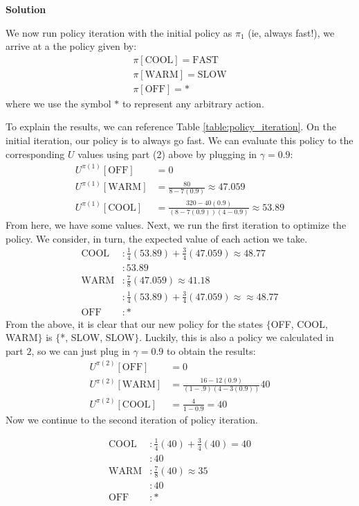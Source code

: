 \documentclass[11pt]{article}
\newcounter{AnswerCounter}
\newcounter{SubAnswerCounter}
\newenvironment{answer}[0]{
  \setcounter{SubAnswerCounter}{1}
  \bigskip
  \textbf{Solution \arabic{AnswerCounter}}
  \\
  \begin{small}
}{
  \end{small}
  \stepcounter{AnswerCounter}
}
\begin{document}
\begin{answer}
We now run policy iteration with the initial policy as $\pi_1$ (ie, always fast!), we arrive at a the policy given by:
\begin{align*}
\pi[\text{COOL}] = \text{FAST} \\
\pi[\text{WARM}] = \text{SLOW} \\
\pi[\text{OFF}] = *
\end{align*}
where we use the symbol $*$ to represent any arbitrary action.

To explain the results, we can reference Table \ref{table:policy_iteration}. On the initial iteration, our policy is to always go fast. We can evaluate this policy to the corresponding $U$ values using part (2) above by plugging in $\gamma = 0.9$:
\begin{align*}
U^{\pi(1)}[\text{OFF}] &= 0 \\
U^{\pi(1)}[\text{WARM}] &= \frac{80}{8-7(0.9)} \approx 47.059\\
U^{\pi(1)}[\text{COOL}] &= \frac{320 - 40(0.9)}{(8-7(0.9))(4 - 0.9)} \approx 53.89
\end{align*}
From here, we have some values. Next, we run the first iteration to optimize the policy. We consider, in turn, the expected value of each action we take.
\begin{align*}
\text{COOL} &: \frac{1}{4}(53.89) + \frac{3}{4}(47.059) \approx 48.77 \tag{fast} \\
&: 53.89 \tag{slow} \\
\text{WARM} &: \frac{7}{8}(47.059) \approx 41.18 \tag{fast} \\
&: \frac{1}{4}(53.89) + \frac{3}{4}(47.059) \approx \approx 48.77 \tag{slow} \\
\text{OFF} &: *
\end{align*}
From the above, it is clear that our new policy for the states $\{$OFF, COOL, WARM$\}$ is $\{$*, SLOW, SLOW$\}$. Luckily, this is also a policy we calculated in part $2$, so we can just plug in $\gamma = 0.9$ to obtain the results:
\begin{align*}
U^{\pi(2)}[\text{OFF}] &= 0 \\
U^{\pi(2)}[\text{WARM}] &= \frac{16 - 12(0.9)}{(1-.9)(4-3(0.9))} 40 \\
U^{\pi(2)}[\text{COOL}] &= \frac{4}{1-0.9} = 40
\end{align*}
Now we continue to the second iteration of policy iteration.

\begin{align*}
\text{COOL} &: \frac{1}{4}(40) + \frac{3}{4}(40) = 40 \tag{fast} \\
&: 40 \tag{slow} \\
\text{WARM} &: \frac{7}{8}(40) \approx 35 \tag{fast} \\
&: 40 \tag{slow} \\
\text{OFF} &: *
\end{align*}


\end{answer}
\end{document}
